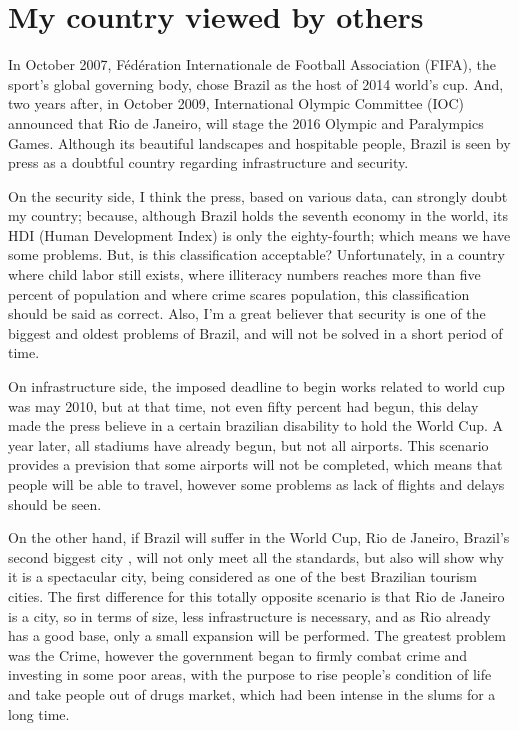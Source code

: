 \documentclass[a4paper,12pt]{article}
\begin{document}
\titleTMB 
\newpage
{} %

\section{My country viewed by others}


In October 2007, Fédération Internationale de Football Association (FIFA), the
sport's global governing body, chose Brazil as the host of 2014 world's cup.
And, two years after, in October 2009, International Olympic Committee (IOC)
announced  that Rio de Janeiro,  will stage  the 2016  Olympic  and Paralympics
Games.  
Although its beautiful landscapes and hospitable people,
Brazil  is seen  by press  as a  doubtful country  regarding  infrastructure and
security.

On the security side, I think the press, based on various data, can strongly doubt my country;
because, although Brazil holds the seventh economy in the world, its HDI (Human
Development Index) is only the eighty-fourth; which means we have some problems.
But, is this  classification acceptable? Unfortunately, in a  country where child
labor still exists, where illiteracy numbers
reaches more  than five percent of  population and  where crime scares
population, this  classification should  be said as  correct. Also, I'm  a great
believer that security is one of  the biggest and oldest problems of Brazil, and
will not be solved in a short period of time.


On infrastructure side, the imposed deadline to begin works related to
world cup was may 2010, but at that time, not even fifty percent had begun, this
delay made the press believe in a certain brazilian disability to hold the World
Cup. A year later, all stadiums have already begun, but not all airports. 
This scenario  provides a  prevision that some  airports will not  be completed,
which means that people will be able to travel, however some problems as lack of
flights and delays should be seen.

On the  other hand,  if Brazil  will suffer in  the World  Cup, Rio  de Janeiro,
Brazil's second  biggest city , will not  only meet all the  standards, but also
will show why it is a spectacular city, being considered as one of the best Brazilian tourism cities.
The first  difference for this totally opposite scenario is that Rio de
Janeiro is a city, so in terms of size, less infrastructure is necessary, and
as Rio already has  a good base, only a small expansion  will be performed.  The
greatest problem  was the Crime, however  the government began  to firmly combat
crime  and investing  in some  poor  areas, with  the purpose  to rise  people's
condition of life and take people out of drugs market, which had been intense in the slums for a long time.
\end{document}
